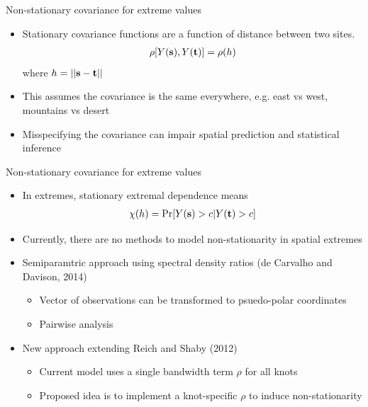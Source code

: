 \documentclass{beamer}
\begin{document}
\begin{frame}{Non-stationary covariance for extreme values}
  \begin{itemize} \setlength{\itemsep}{1em}
    \item Stationary covariance functions are a function of distance between two sites.
    \begin{align*}
      \rho[Y(\mbox{\bf s}), Y(\mbox{\bf t})] = \rho(h)
    \end{align*}
    where $h = ||\mbox{\bf s} - \mbox{\bf t}||$
    \item This assumes the covariance is the same everywhere, e.g. east vs west, mountains vs desert
    \item Misspecifying the covariance can impair spatial prediction and statistical inference
  \end{itemize}
\end{frame}

\begin{frame}{Non-stationary covariance for extreme values}
  \begin{itemize} \setlength{\itemsep}{0.5em}
    \item In extremes, stationary extremal dependence means
    \begin{align*}
      \chi(h) = \Pr[Y(\mbox{\bf s}) > c | Y(\mbox{\bf t}) > c]
    \end{align*}
    \item Currently, there are no methods to model non-stationarity in spatial extremes
    \item Semiparamtric approach using spectral density ratios (de Carvalho and Davison, 2014)
    \begin{itemize} \setlength{\itemsep}{0.25em}
      \item Vector of observations can be transformed to psuedo-polar coordinates
      \item Pairwise analysis
    \end{itemize}
    \item New approach extending Reich and Shaby (2012)
    \begin{itemize} \setlength{\itemsep}{0.25em}
      \item Current model uses a single bandwidth term $\rho$ for all knots
      \item Proposed idea is to implement a knot-specific $\rho$ to induce non-stationarity
    \end{itemize}
  \end{itemize}
\end{frame}
\end{document}
